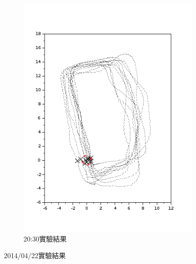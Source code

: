 \begin{figure}[h!]
\begin{subfigure}[t]{0.32\textwidth}
		\includegraphics[width=\textwidth]{figures/appendix1/dynamic_3}
		\caption{20:30實驗結果}
		\label{f:app:dynamic_3}
	\end{subfigure}
	\caption{2014/04/22實驗結果}
\end{figure}
